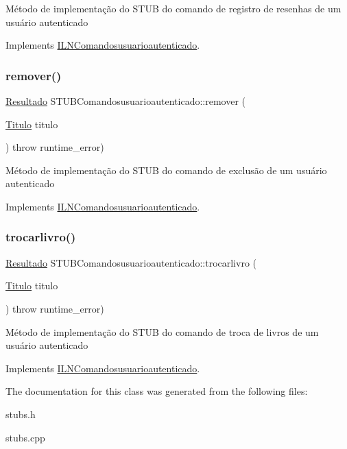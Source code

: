 Método de implementação do S\+T\+UB do comando de registro de resenhas de um usuário autenticado 

Implements \hyperlink{classILNComandosusuarioautenticado}{I\+L\+N\+Comandosusuarioautenticado}.

\mbox{\label{classSTUBComandosusuarioautenticado_ade03e70408581ca1185da788b862f66c}} 
\subsubsection{\texorpdfstring{remover()}{remover()}}
{\footnotesize\ttfamily \hyperlink{classResultado}{Resultado} S\+T\+U\+B\+Comandosusuarioautenticado\+::remover (\begin{DoxyParamCaption}\item[{\hyperlink{classTitulo}{Titulo}}]{titulo }\end{DoxyParamCaption}) throw  runtime\+\_\+error) \hspace{0.3cm}{\ttfamily [virtual]}}

Método de implementação do S\+T\+UB do comando de exclusão de um usuário autenticado 

Implements \hyperlink{classILNComandosusuarioautenticado}{I\+L\+N\+Comandosusuarioautenticado}.

\mbox{\label{classSTUBComandosusuarioautenticado_a21a724886a8e5ff41cb44557a8904f74}} 
\subsubsection{\texorpdfstring{trocarlivro()}{trocarlivro()}}
{\footnotesize\ttfamily \hyperlink{classResultado}{Resultado} S\+T\+U\+B\+Comandosusuarioautenticado\+::trocarlivro (\begin{DoxyParamCaption}\item[{\hyperlink{classTitulo}{Titulo}}]{titulo }\end{DoxyParamCaption}) throw  runtime\+\_\+error) \hspace{0.3cm}{\ttfamily [virtual]}}

Método de implementação do S\+T\+UB do comando de troca de livros de um usuário autenticado 

Implements \hyperlink{classILNComandosusuarioautenticado}{I\+L\+N\+Comandosusuarioautenticado}.



The documentation for this class was generated from the following files\+:\begin{DoxyCompactItemize}
\item 
stubs.\+h\item 
stubs.\+cpp\end{DoxyCompactItemize}

